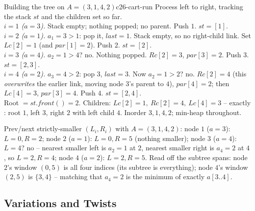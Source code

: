 \begin{example}{Building the tree on $A=(3,1,4,2)$}{c26-cart-run}
Process left to right, tracking the stack $\mathit{st}$ and the children set so far.\\
\emph{$i=1$ ($a=3$).} Stack empty; nothing popped; no parent. Push $1$. $\mathit{st}=[1]$.\\
\emph{$i=2$ ($a=1$).} $a_1=3>1$: pop it, $\mathit{last}=1$. Stack empty, so no right-child link.
Set $\mathit{Lc}[2]=1$ (and $\mathit{par}[1]=2$). Push $2$. $\mathit{st}=[2]$.\\
\emph{$i=3$ ($a=4$).} $a_2=1>4$? no. Nothing popped. $\mathit{Rc}[2]=3$, $\mathit{par}[3]=2$. Push
$3$. $\mathit{st}=[2,3]$.\\
\emph{$i=4$ ($a=2$).} $a_3=4>2$: pop $3$, $\mathit{last}=3$. Now $a_2=1>2$? no. $\mathit{Rc}[2]=4$
(this \emph{overwrites} the earlier link, moving node $3$'s parent to $4$), $\mathit{par}[4]=2$; then
$\mathit{Lc}[4]=3$, $\mathit{par}[3]=4$. Push $4$. $\mathit{st}=[2,4]$.\\
Root $=\mathit{st.front()}=2$. Children: $\mathit{Lc}[2]=1,\ \mathit{Rc}[2]=4,\ \mathit{Lc}[4]=3$ --
exactly : root $1$, left $3$, right $2$ with left child $4$. Inorder
$3,1,4,2$; min-heap throughout. \checkmark
\end{example}
\begin{tracebox}
Prev/next strictly-smaller $(L_i,R_i)$ with $A=(3,1,4,2)$: node $1$ ($a=3$): $L=0,R=2$; node $2$
($a=1$): $L=0,R=5$ (nothing smaller); node $3$ ($a=4$): $L=4$? no -- nearest smaller left is $a_2=1$
at $2$, nearest smaller right is $a_4=2$ at $4$, so $L=2,R=4$; node $4$ ($a=2$): $L=2,R=5$. Read off
the subtree spans: node $2$'s window $(0,5)$ is all four indices (its subtree is everything); node
$4$'s window $(2,5)$ is $\{3,4\}$ -- matching that $a_4{=}2$ is the minimum of exactly $a[3..4]$.
\end{tracebox}

\subsection{Variations and Twists}

